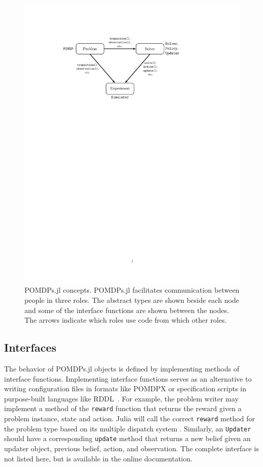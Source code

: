 \begin{figure}[htpb]
    \centering
    \includegraphics[width=0.8\linewidth]{media/arch.pdf}
    \caption[POMDPs.jl concepts]{POMDPs.jl concepts. POMDPs.jl facilitates communication between people in three roles. The abstract types are shown beside each node and some of the interface functions are shown between the nodes. The arrows indicate which roles use code from which other roles.}
    \label{fig:concepts}
\end{figure}

\subsection{Interfaces}

The behavior of POMDPs.jl objects is defined by implementing methods of interface functions.
Implementing interface functions serves as an alternative to writing configuration files in formats like POMDPX or specification scripts in purpose-built languages like RDDL~\cite{sanner2010rddl}.
For example, the problem writer may implement a method of the \texttt{reward} function that returns the reward given a problem instance, state and action.
Julia will call the correct \texttt{reward} method for the problem type based on its multiple dispatch system \cite{bezanson2017julia}.
Similarly, an \texttt{Updater} should have a corresponding \texttt{update} method that returns a new belief given an updater object, previous belief, action, and observation.
The complete interface is not listed here, but is available in the online documentation.

